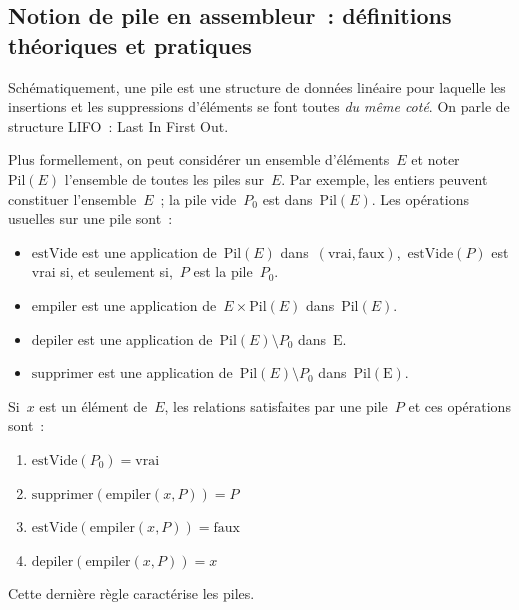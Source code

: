 \begin{frame}
  \section{Notion de pile en assembleur~: d\'efinitions th\'eoriques et pratiques}%
Sch\'ematiquement, une pile est  une structure de donn\'ees lin\'eaire
pour laquelle les insertions et les suppressions d'\'el\'ements se font
toutes \textit{du  m\^eme    cot\'e}.     On  parle    de    structure
LIFO~: Last In First Out.
\par
Plus formellement, on peut consid\'erer un ensemble d'\'el\'ements~$E$
et  noter~$\mathrm{Pil}(E)$ l'ensemble de  toutes  les piles sur~$E$.  
Par  exemple, les entiers peuvent  constituer l'ensemble~$E$~; la pile
vide~$P_{0}$    est dans~$\mathrm{Pil}(E)$.  Les op\'erations usuelles
sur une pile sont~:
\begin{itemize}
\item $\mathrm{estVide}$   est   une application  de~$\mathrm{Pil}(E)$
  dans~${(\mathrm{vrai},\mathrm{faux})}$,~${\mathrm{estVide}(P)}$  est
  vrai si, et seulement si,~$P$ est la pile~$P_{0}$.
\item       $\mathrm{empiler}$         est         une     application
  de~${E\times\mathrm{Pil}(E)}$ dans~${\mathrm{Pil}(E)}$.
\item          $\mathrm{depiler}$          est  une       application
  de~${\mathrm{Pil}(E)\setminus P_{0}}$ dans~$\mathrm{E}$.
\item       $\mathrm{supprimer}$        est    une         application
  de~${\mathrm{Pil}(E)\setminus P_{0}}$ dans~$\mathrm{Pil(E)}$.
\end{itemize}
\end{frame}
\begin{frame}
Si~$x$ est un  \'el\'ement de~$E$, les  relations satisfaites par une
pile~$P$ et ces op\'erations sont~:
\begin{enumerate}
\item ${\mathrm{estVide}(P_{0})=\mathrm{vrai}}$
\item ${\mathrm{supprimer}(\mathrm{empiler}(x,P))=P}$
\item ${\mathrm{estVide}(\mathrm{empiler}(x,P))=\mathrm{faux}}$
\item ${\mathrm{depiler}(\mathrm{empiler}(x,P))=x}$
\end{enumerate}
Cette derni\`ere r\`egle caract\'erise les piles.
\end{frame}

